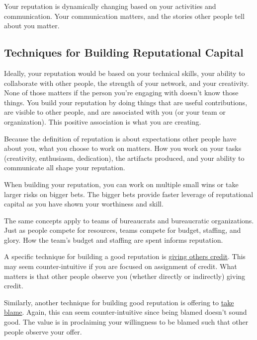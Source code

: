 Your reputation is dynamically changing based on your activities and communication. Your communication matters, and the stories other people tell about you matter.

\subsection*{Techniques for Building Reputational Capital}

Ideally, your reputation would be based on your technical skills, your ability to collaborate with other people, the strength of your network, and your creativity. None of those matters if the person you're engaging with doesn't know those things. 
You build your reputation by doing things that are useful contributions, are visible to other people, and are associated with you (or your team or organization). This positive association is what you are creating.

Because the definition of reputation is about expectations other people have about you, what you choose to work on matters. How you work on your tasks (creativity, enthusiasm, dedication), the artifacts produced, and your ability to communicate all shape your reputation. 

When building your reputation, you can work on multiple small wins or take larger risks on bigger bets. The bigger bets provide faster leverage of reputational capital as you have shown your worthiness and skill. 

The same concepts apply to teams of bureaucrats and bureaucratic organizations. Just as people compete for resources, teams compete for budget, staffing, and glory. How the team's budget and staffing are spent informs reputation. 

A specific technique for building a good reputation is 
\hyperref[sec:credit-others]{giving others credit}. 
%
%
This may seem counter-intuitive if you are focused on assignment of credit. What  matters is that other people observe you (whether directly or indirectly) giving credit. 

Similarly, another technique for building good reputation is offering to \hyperref[sec:take-blame]{take blame}.
%
%
Again, this can seem counter-intuitive since being blamed doesn't sound good. The value is in proclaiming your willingness to be blamed such that other people observe your offer. 

